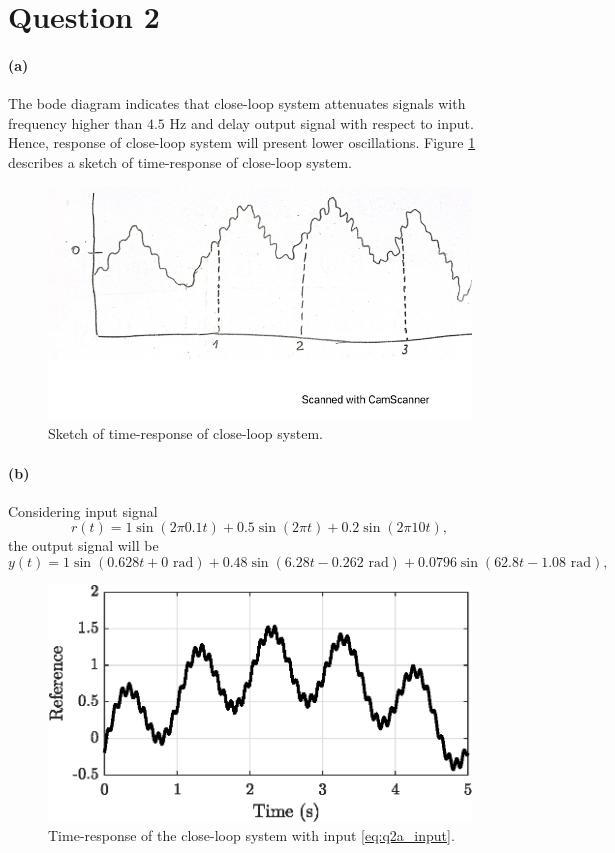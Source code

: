 \section{Question 2}

\paragraph{(a)} The bode diagram indicates that close-loop system attenuates signals with frequency higher than $4.5$ Hz and delay output signal with respect to input. Hence, response of close-loop system will present lower oscillations. Figure \ref{fig:q2_mano} describes a sketch of time-response of close-loop system. 

\begin{figure}[h!]
\centering
\includegraphics{images/question2/q2_a_mano.pdf}
\caption{Sketch of time-response of close-loop system.}
\label{fig:q2_mano}
\end{figure}

\paragraph{(b)} Considering input signal
\begin{equation}
r(t)=1\sin{(2 \pi 0.1 t)} + 0.5\sin{(2 \pi t)} + 0.2\sin{(2 \pi 10 t)},
\label{eq:q2a_input}
\end{equation}
the output signal will be
\begin{equation*}
y(t) = 1\sin{(0.628 t + 0 \textrm{ rad})} + 0.48\sin{(6.28 t - 0.262 \textrm{ rad})} + 0.0796\sin{(62.8 t-1.08 \textrm{ rad})},
\end{equation*}

\begin{figure}[h!]
\centering
\includegraphics{images/question2/act_2a.eps}
\caption{Time-response of the close-loop system with input \eqref{eq:q2a_input}.}
\end{figure}
